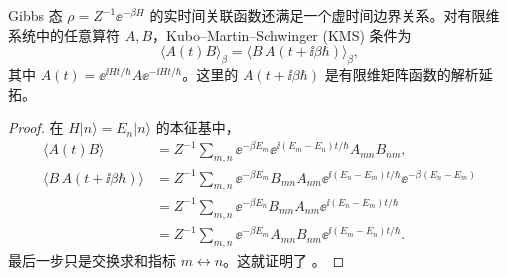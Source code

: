 \begin{proposition}
Gibbs 态 \(\rho=Z^{-1}\ee^{-\beta H}\) 的实时间关联函数还满足一个虚时间边界关系。对有限维系统中的任意算符 \(A,B\)，Kubo--Martin--Schwinger (KMS) 条件为
\begin{equation}
 \langle A(t)B\rangle_\beta
 =\langle B\,A(t+\ii\beta\hbar)\rangle_\beta,
 \label{eq:phys-sm-kms-condition}
\end{equation}
其中 \(A(t)=\ee^{\ii Ht/\hbar}A\ee^{-\ii Ht/\hbar}\)。这里的 \(A(t+\ii\beta\hbar)\) 是有限维矩阵函数的解析延拓。\end{proposition}
\begin{proof}
在 \(H|n\rangle=E_n|n\rangle\) 的本征基中，
\begin{align*}
 \langle A(t)B\rangle
 &= Z^{-1}\sum_{m,n}\ee^{-\beta E_m}\ee^{\ii(E_m-E_n)t/\hbar}A_{mn}B_{nm},\\
 \langle B\,A(t+\ii\beta\hbar)\rangle
 &=Z^{-1}\sum_{m,n}\ee^{-\beta E_m}B_{mn}A_{nm}
    \ee^{\ii(E_n-E_m)t/\hbar}\ee^{-\beta(E_n-E_m)}\\
 &=Z^{-1}\sum_{m,n}\ee^{-\beta E_n}B_{mn}A_{nm}
    \ee^{\ii(E_n-E_m)t/\hbar}\\
 &=Z^{-1}\sum_{m,n}\ee^{-\beta E_m}A_{mn}B_{nm}
    \ee^{\ii(E_m-E_n)t/\hbar}.
\end{align*}
最后一步只是交换求和指标 \(m\leftrightarrow n\)。这就证明了 。
\end{proof}

